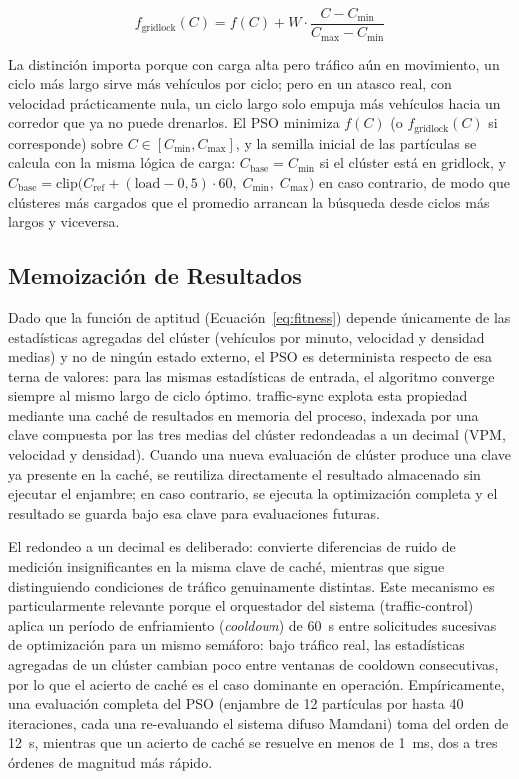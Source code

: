 \begin{equation}
f_{\text{gridlock}}(C) = f(C) + W \cdot \frac{C - C_{\min}}{C_{\max} - C_{\min}}
\label{eq:fitness_gridlock}
\end{equation}

\noindent La distinción importa porque con carga alta pero tráfico aún en movimiento, un
ciclo más largo sirve más vehículos por ciclo; pero en un atasco real, con velocidad
prácticamente nula, un ciclo largo solo empuja más vehículos hacia un corredor que ya no
puede drenarlos. El PSO minimiza $f(C)$ (o $f_{\text{gridlock}}(C)$ si corresponde) sobre
$C \in [C_{\min}, C_{\max}]$, y la semilla inicial de las partículas se calcula con la misma
lógica de carga: $C_{\text{base}} = C_{\min}$ si el clúster está en gridlock, y
$C_{\text{base}} = \text{clip}\bigl(C_{\text{ref}} + (\text{load} - 0{,}5) \cdot 60,\; C_{\min},\; C_{\max}\bigr)$
en caso contrario, de modo que clústeres más cargados que el promedio arrancan la búsqueda
desde ciclos más largos y viceversa.

\subsection{Memoización de Resultados}
\label{subsec:pso_memoizacion}

Dado que la función de aptitud (Ecuación~\ref{eq:fitness}) depende únicamente de las estadísticas agregadas del clúster (vehículos por minuto, velocidad y densidad medias) y no de ningún estado externo, el PSO es determinista respecto de esa terna de valores: para las mismas estadísticas de entrada, el algoritmo converge siempre al mismo largo de ciclo óptimo. traffic-sync explota esta propiedad mediante una caché de resultados en memoria del proceso, indexada por una clave compuesta por las tres medias del clúster redondeadas a un decimal (VPM, velocidad y densidad). Cuando una nueva evaluación de clúster produce una clave ya presente en la caché, se reutiliza directamente el resultado almacenado sin ejecutar el enjambre; en caso contrario, se ejecuta la optimización completa y el resultado se guarda bajo esa clave para evaluaciones futuras.

El redondeo a un decimal es deliberado: convierte diferencias de ruido de medición insignificantes en la misma clave de caché, mientras que sigue distinguiendo condiciones de tráfico genuinamente distintas. Este mecanismo es particularmente relevante porque el orquestador del sistema (traffic-control) aplica un período de enfriamiento (\emph{cooldown}) de 60~s entre solicitudes sucesivas de optimización para un mismo semáforo: bajo tráfico real, las estadísticas agregadas de un clúster cambian poco entre ventanas de cooldown consecutivas, por lo que el acierto de caché es el caso dominante en operación. Empíricamente, una evaluación completa del PSO (enjambre de 12 partículas por hasta 40 iteraciones, cada una re-evaluando el sistema difuso Mamdani) toma del orden de 12~s, mientras que un acierto de caché se resuelve en menos de 1~ms, dos a tres órdenes de magnitud más rápido.

